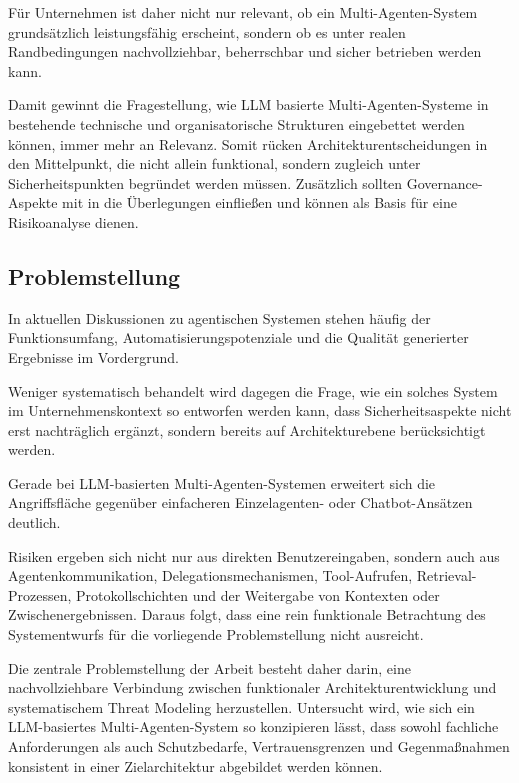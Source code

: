 Für Unternehmen ist daher nicht nur relevant, ob ein Multi-Agenten-System grundsätzlich leistungsfähig erscheint, sondern ob es unter realen Randbedingungen nachvollziehbar, beherrschbar und sicher betrieben werden kann. \cite{raza_trism_2026,ferrag_prompt_2026}

\newpage

Damit gewinnt die Fragestellung, wie LLM basierte Multi-Agenten-Systeme in bestehende technische und organisatorische Strukturen eingebettet werden können, immer mehr an Relevanz. Somit rücken Architekturentscheidungen in den Mittelpunkt, die nicht allein funktional, sondern zugleich unter Sicherheitspunkten begründet werden müssen.  \cite{wong_adding_2000,krawiecka_extending_2025} Zusätzlich sollten Governance-Aspekte mit in die Überlegungen einfließen und können als Basis für eine Risikoanalyse dienen.

\subsection{Problemstellung}

In aktuellen Diskussionen zu agentischen Systemen stehen häufig der Funktionsumfang,  Automatisierungspotenziale und die Qualität generierter Ergebnisse im Vordergrund. \cite{krawiecka_extending_2025,ferrag_prompt_2026,zhang_agent_2026}

Weniger systematisch behandelt wird dagegen die Frage, wie ein solches System im Unternehmenskontext so entworfen werden kann, dass Sicherheitsaspekte nicht erst nachträglich ergänzt, sondern bereits auf Architekturebene berücksichtigt werden. \cite{tete_threat_2024,wong_adding_2000,ferrag_prompt_2026}

Gerade bei LLM-basierten Multi-Agenten-Systemen erweitert sich die Angriffsfläche gegenüber einfacheren Einzelagenten- oder Chatbot-Ansätzen deutlich. \cite{wong_adding_2000,ferrag_prompt_2026,anbiaee_security_2026}

Risiken ergeben sich nicht nur aus direkten Benutzereingaben, sondern auch aus Agentenkommunikation, Delegationsmechanismen, Tool-Aufrufen, Retrieval-Prozessen, Protokollschichten und der Weitergabe von Kontexten oder Zwischenergebnissen. \cite{wong_adding_2000,krawiecka_extending_2025,ferrag_prompt_2026, andric_pdf_nodate, zhang_agent_2026} 
Daraus folgt, dass eine rein funktionale Betrachtung des Systementwurfs für die vorliegende Problemstellung nicht ausreicht. \cite{wong_adding_2000,tete_threat_2024}

Die zentrale Problemstellung der Arbeit besteht daher darin, eine nachvollziehbare Verbindung zwischen funktionaler Architekturentwicklung und systematischem Threat Modeling herzustellen. Untersucht wird, wie sich ein LLM-basiertes Multi-Agenten-System so konzipieren lässt, dass sowohl fachliche Anforderungen als auch Schutzbedarfe, Vertrauensgrenzen und Gegenmaßnahmen konsistent in einer Zielarchitektur abgebildet werden können. \cite{krawiecka_extending_2025, ferrag_prompt_2026}

